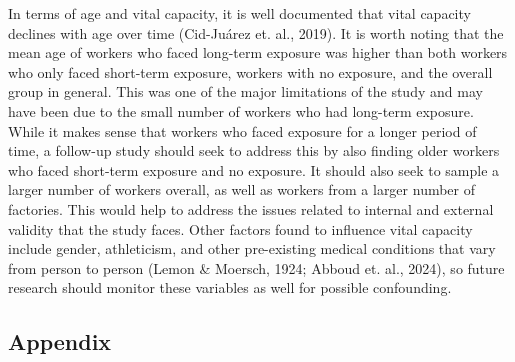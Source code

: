 \documentclass{article}
\begin{document}
		In terms of age and vital capacity, it is well documented that vital capacity declines with age over time (Cid-Juárez et. al., 2019). It is worth noting that the mean age of workers who faced long-term exposure was higher than both workers who only faced short-term exposure, workers with no exposure, and the overall group in general. This was one of the major limitations of the study and may have been due to the small number of workers who had long-term exposure. While it makes sense that workers who faced exposure for a longer period of time, a follow-up study should seek to address this by also finding older workers who faced short-term exposure and no exposure. It should also seek to sample a larger number of workers overall, as well as workers from a larger number of factories. This would help to address the issues related to internal and external validity that the study faces. Other factors found to influence vital capacity include gender, athleticism, and other pre-existing medical conditions that vary from person to person (Lemon \& Moersch, 1924; Abboud et. al., 2024), so future research should monitor these variables as well for possible confounding.

		\newpage
		\subsection*{Appendix}
\end{document}
